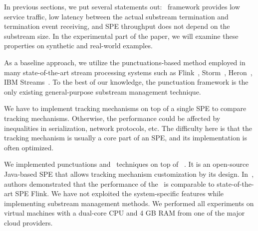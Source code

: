 In previous sections, we put several statements out: \tracker\ framework provides low service traffic, low latency between the actual substream termination and termination event receiving, and SPE throughput does not depend on the substream size. In the experimental part of the paper, we will examine these properties on synthetic and real-world examples. 

As a baseline approach, we utilize the punctuations-based method employed in many state-of-the-art stream processing systems such as Flink~\cite{Carbone:2017:SMA:3137765.3137777}, Storm~\cite{apache:storm:state}, Heron~\cite{Kulkarni:2015:THS:2723372.2742788}, IBM Streams~\cite{jacques2016consistent}. To the best of our knowledge, the punctuation framework is the only existing general-purpose substream management technique. 

We have to implement tracking mechanisms on top of a single SPE to compare tracking mechanisms. Otherwise, the performance could be affected by inequalities in serialization, network protocols, etc.  The difficulty here is that the tracking mechanism is usually a core part of an SPE, and its implementation is often optimized. 

We implemented punctuations and \tracker\ techniques on top of \FlameStream~\cite{we2018beyondmr}. It is an open-source Java-based SPE that allows tracking mechanism customization by its design. In~\cite{we2018adbis}, authors demonstrated that the performance of the \FlameStream\ is comparable to state-of-the-art SPE Flink. We have not exploited the system-specific features while implementing substream management methods. We performed all experiments on virtual machines with a dual-core CPU and 4 GB RAM from one of the major cloud providers. 

